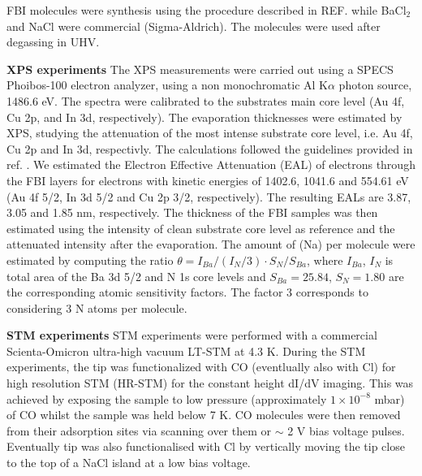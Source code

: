 \documentclass[aps,prl,reprint,longbibliography,superscriptaddress, english]{revtex4-1}
\def\BappCl{BaCl$_2$ }
\begin{document}
FBI molecules were synthesis using the procedure described in REF.\cite{rivilla_fluorescent_2020} while \BappCl and NaCl were commercial (Sigma-Aldrich). The molecules were used after degassing in UHV.


\textbf{XPS experiments}
The XPS measurements were carried out using a SPECS Phoibos-100 electron analyzer, using a non monochromatic Al K$\alpha$ photon source, 1486.6 eV. The spectra were calibrated to the substrates main core level (Au 4f, Cu 2p, and In 3d, respectively). 
The evaporation thicknesses were estimated by XPS, studying the attenuation of the most intense substrate core level, i.e. Au 4f, Cu 2p and In 3d, respectivly. The calculations followed the guidelines provided in ref. \cite{powell_practical_2020}. We estimated the Electron Effective Attenuation (EAL) of electrons through the FBI layers for electrons with kinetic energies of 1402.6, 1041.6 and 554.61 eV (Au 4f 5/2, In 3d 5/2 and Cu 2p 3/2, respectively). The resulting EALs are 3.87, 3.05 and 1.85 nm, respectively. The thickness of the FBI samples was then estimated using the intensity of clean substrate core level as reference and the attenuated intensity after the evaporation. The amount of \Bapp (Na) per molecule were estimated by computing  the ratio $\theta=I_{Ba}/(I_N/3) \cdot S_N/S_{Ba} $, where $I_{Ba}$, $I_N$ is total area  of the  Ba 3d 5/2 and  N 1s  core  levels and $S_{Ba} = 25.84$, $S_N = 1.80$ are the corresponding atomic sensitivity factors\cite{scofield_hartree-slater_1976}. The factor 3 corresponds to considering 3 N atoms per molecule.

\textbf{STM experiments}
STM experiments were performed with a commercial Scienta-Omicron ultra-high vacuum LT-STM at 4.3 K. During the STM experiments, the tip was functionalized with CO (eventlually also with Cl) for high resolution STM (HR-STM) for the constant height dI/dV imaging. This was achieved by exposing the
sample to low pressure (approximately $1 \times 10^{-8}$ mbar) of CO whilst the sample was held below 7 K. CO molecules were then removed
from their adsorption sites via scanning over them or $\sim$ 2 V bias voltage pulses. Eventually tip was also functionalised with
Cl by vertically moving the tip close to the top of a NaCl island at a low bias voltage.

 

\end{document}
